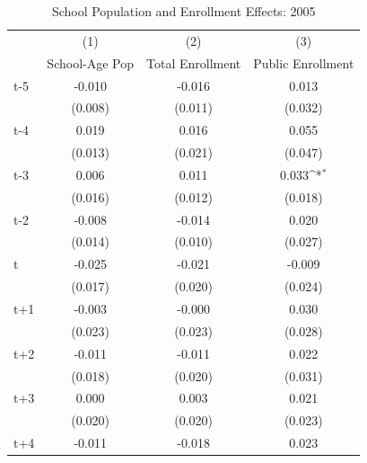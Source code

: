 \begin{table}[htbp]\centering
\def\sym#1{\ifmmode^{#1}\else\(^{#1}\)\fi}
\caption{School Population and Enrollment Effects: 2005}
\begin{tabular}{l*{3}{c}}
\hline\hline
            &\multicolumn{1}{c}{(1)}&\multicolumn{1}{c}{(2)}&\multicolumn{1}{c}{(3)}\\
            &\multicolumn{1}{c}{School-Age Pop}&\multicolumn{1}{c}{Total Enrollment}&\multicolumn{1}{c}{Public Enrollment}\\
\hline
t-5         &      -0.010         &      -0.016         &       0.013         \\
            &     (0.008)         &     (0.011)         &     (0.032)         \\
[1em]
t-4         &       0.019         &       0.016         &       0.055         \\
            &     (0.013)         &     (0.021)         &     (0.047)         \\
[1em]
t-3         &       0.006         &       0.011         &       0.033\sym{*}  \\
            &     (0.016)         &     (0.012)         &     (0.018)         \\
[1em]
t-2         &      -0.008         &      -0.014         &       0.020         \\
            &     (0.014)         &     (0.010)         &     (0.027)         \\
[1em]
t           &      -0.025         &      -0.021         &      -0.009         \\
            &     (0.017)         &     (0.020)         &     (0.024)         \\
[1em]
t+1         &      -0.003         &      -0.000         &       0.030         \\
            &     (0.023)         &     (0.023)         &     (0.028)         \\
[1em]
t+2         &      -0.011         &      -0.011         &       0.022         \\
            &     (0.018)         &     (0.020)         &     (0.031)         \\
[1em]
t+3         &       0.000         &       0.003         &       0.021         \\
            &     (0.020)         &     (0.020)         &     (0.023)         \\
[1em]
t+4         &      -0.011         &      -0.018         &       0.023         \\

\end{tabular}
\end{table}

